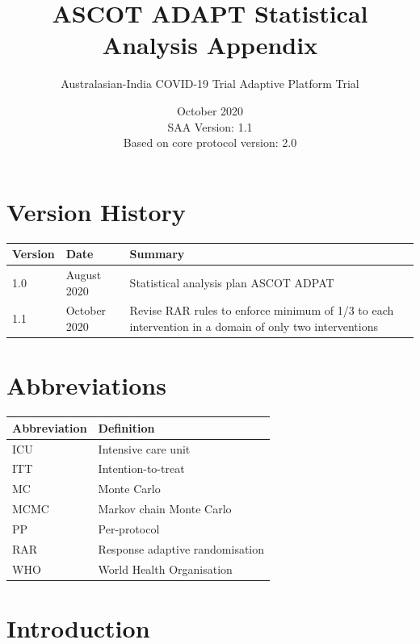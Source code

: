\documentclass[
  11pt,
]{article}
\title{ASCOT ADAPT Statistical Analysis Appendix}
\subtitle{Australasian-India COVID-19 Trial Adaptive Platform Trial}
\author{}
\date{\vspace{-2.5em}October 2020\\
SAA Version: 1.1\\
Based on core protocol version: 2.0}
\begin{document}
\maketitle

{
\setcounter{tocdepth}{2}
\tableofcontents
}
\hypertarget{version-history}{%
\section*{Version History}\label{version-history}}

\begin{center}
    \begin{tabular}{llp{8cm}}
    \hline
    Version & Date & Summary \\ \hline
    1.0 & August 2020 & Statistical analysis plan ASCOT ADPAT \\
    1.1 & October 2020 & Revise RAR rules to enforce minimum of 1/3 to each intervention in a domain of only two interventions \\
    \hline
    \end{tabular}
\end{center}

\hypertarget{abbreviations}{%
\section*{Abbreviations}\label{abbreviations}}

\begin{table}[H]
\centering
\begin{tabular}{ll}
\toprule
Abbreviation & Definition\\
\midrule
ICU & Intensive care unit\\
ITT & Intention-to-treat\\
MC & Monte Carlo\\
MCMC & Markov chain Monte Carlo\\
PP & Per-protocol\\
RAR & Response adaptive randomisation\\
WHO & World Health Organisation\\
\bottomrule
\end{tabular}
\end{table}

\clearpage

\hypertarget{introduction}{%
\section{Introduction}\label{introduction}}
\end{document}
